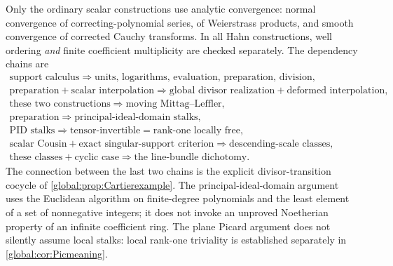 \documentclass[11pt,letterpaper]{article}
\theoremstyle{definition}
\theoremstyle{remark}
\numberwithin{equation}{section}
\begin{document}
Only the ordinary scalar constructions use analytic convergence: normal convergence of correcting-polynomial series, of Weierstrass products, and smooth convergence of corrected Cauchy transforms. In all Hahn constructions, well ordering \emph{and} finite coefficient multiplicity are checked separately. The dependency chains are
\[
  \begin{gathered}
  \text{support calculus}\Longrightarrow
  \text{units, logarithms, evaluation, preparation, division},\\
  \text{preparation}+\text{scalar interpolation}\Longrightarrow
  \text{global divisor realization}+\text{deformed interpolation},\\
  \text{these two constructions}\Longrightarrow\text{moving Mittag--Leffler},\\
  \text{preparation}\Longrightarrow\text{principal-ideal-domain stalks},\\
  \text{PID stalks}\Longrightarrow\text{tensor-invertible}=\text{rank-one locally free},\\
  \text{scalar Cousin}+\text{exact singular-support criterion}
  \Longrightarrow\text{descending-scale classes},\\
  \text{these classes}+\text{cyclic case}\Longrightarrow\text{the line-bundle dichotomy}.
  \end{gathered}
\]
The connection between the last two chains is the explicit divisor-transition cocycle of \cref{global:prop:Cartierexample}. The principal-ideal-domain argument uses the Euclidean algorithm on finite-degree polynomials and the least element of a set of nonnegative integers; it does not invoke an unproved Noetherian property of an infinite coefficient ring. The plane Picard argument does not silently assume local stalks: local rank-one triviality is established separately in \cref{global:cor:Picmeaning}.
\end{document}
